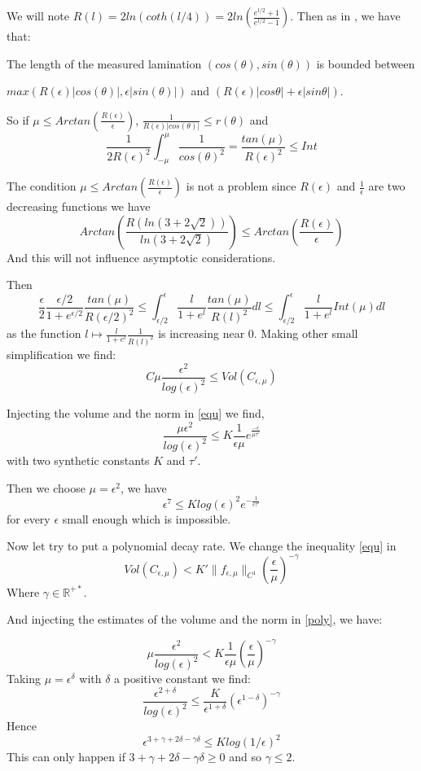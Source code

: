 We will note $R(l)=2ln(coth(l/4))=2ln(\frac{e^{l/2}+1}{e^{l/2}-1})$. Then as in \cite{fu2015cusp}, we have that:

\begin{note}
The length of the measured lamination $(cos(\theta),sin(\theta))$ is bounded between

$max(R(\epsilon)|cos(\theta)|,\epsilon |sin(\theta)|)$ and $(R(\epsilon)|cos \theta | + \epsilon |sin \theta |)$.
\end{note}

So if $\mu \leq Arctan(\frac{R(\epsilon)}{\epsilon})$, $\frac{1}{R(\epsilon)|cos(\theta)|} \leq r(\theta)$ and \[
\frac{1}{2 R(\epsilon)^2} \int_{-\mu}^\mu \frac{1}{cos(\theta)^2}=\frac{tan(\mu)}{R(\epsilon)^2}\leq Int
\]

\begin{note}
The condition $\mu \leq Arctan(\frac{R(\epsilon)}{\epsilon})$ is not a problem since $R(\epsilon)$ and $\frac{1}{\epsilon}$ are two decreasing functions we have \[
Arctan(\frac{R(ln(3+2 \sqrt{2}))}{ln(3+2 \sqrt{2})}) \leq Arctan(\frac{R(\epsilon)}{\epsilon})
\]
And this will not influence asymptotic considerations.
\end{note}

Then \[
 \frac{\epsilon}{2} \frac{\epsilon /2}{1+e^{\epsilon /2}} \frac{tan(\mu)}{R(\epsilon /2)^2}
 \leq \int_{\epsilon/2}^\epsilon \frac{l}{1+e^l}\frac{ tan(\mu)}{R(l)^2}dl
 \leq  \int_{\epsilon/2}^\epsilon \frac{l}{1+e^l} Int(\mu) dl
\]
as the function $l \mapsto \frac{l}{1+e^l}\frac{1}{R(l)^2}$ is increasing near $0$. Making other small simplification we find: \[
C \mu \frac{\epsilon^2}{log(\epsilon)^2} \leq  Vol(C_{\epsilon,\mu})
\]

Injecting the volume and the norm in \ref{equ} we find,
 \[
\frac{\mu \epsilon^2}{log(\epsilon)^2} \leq K \frac{1}{\epsilon \mu} e^{\frac{- \epsilon}{\mu \tau'}}
\]
with two synthetic constants $K$ and $\tau'$.

Then we choose $\mu = \epsilon^2$, we have \[
\epsilon^7 \leq K log(\epsilon )^2 e^{- \frac{1}{\epsilon \tau'}}
\]
for every $\epsilon$ small enough which is impossible.


Now let try to put a polynomial decay rate. We change the inequality \ref{equ} in
\begin{equation}
Vol(C_{\epsilon,\mu}) < K' \| f_{\epsilon,\mu} \|_{C^1} (\frac{\epsilon}{\mu})^{-\gamma}
\label{poly}
\end{equation}
Where $\gamma \in \mathbb{R^{+*}}$.

And injecting the estimates of the volume and the norm in \ref{poly}, we have:

\[
\mu \frac{\epsilon^2}{log(\epsilon)^2}  < K \frac{1}{\epsilon \mu} (\frac{\epsilon}{\mu })^{- \gamma}
\]
 Taking $\mu=\epsilon^{\delta}$ with $\delta$  a positive constant we find: \[
\frac{\epsilon^{2+\delta}}{log(\epsilon)^2} \leq \frac{K}{\epsilon^{1+\delta}}(\epsilon^{1-\delta})^{-\gamma}
\]
Hence \[
\epsilon^{3+\gamma+2 \delta - \gamma \delta} \leq K log(1/ \epsilon)^2
\]
This can only happen if $3+\gamma+2 \delta - \gamma \delta \geq 0$ and so $\gamma \leq 2$.
